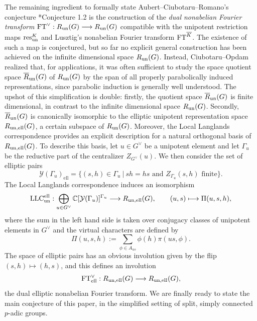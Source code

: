 The remaining ingredient to formally state Aubert--Ciubotaru--Romano's conjecture \cite{AubertCiubotaruRomano2024}*{Conjecture 1.2} is the construction of the \textit{dual nonabelian Fourier transform} $\mathrm{FT}^\vee:R_{\mathrm{un}}(G)\longrightarrow R_{\mathrm{un}}(G)$ compatible with the unipotent restriction maps $\mathrm{res}_{\mathrm{un}}^K$ and Lusztig's nonabelian Fourier transform $\mathrm{FT}^{\overline{K}}$. The existence of such a map is conjectured, but so far no explicit general construction has been achieved on the infinite dimensional space $R_{\mathrm{un}}(G)$. Instead, Ciubotaru--Opdam \cite{CiubotaruOpdam2010} realized that, for applications, it was often sufficient to study the space quotient space $\overline{R}_{\mathrm{un}}(G)$ of $R_{\mathrm{un}}(G)$ by the span of all properly parabolically induced representations, since parabolic induction is generally well understood. The upshot of this simplification is double: firstly, the quotient space $\overline{R}_{\mathrm{un}}(G)$ is finite dimensional, in contrast to the infinite dimensional space $R_{\mathrm{un}}(G)$. Secondly, $\overline{R}_{\mathrm{un}}(G)$ is canonically isomorphic to the elliptic unipotent representation space $R_{\mathrm{un},\mathrm{ell}}(G)$, a certain subspace of $R_{\mathrm{un}}(G)$. Moreover, the Local Langlands correspondence provides an explicit description for a natural orthogonal basis of $R_{\mathrm{un},\mathrm{ell}}(G)$. To describe this basis, let $u\in G^\vee$ be a unipotent element and let $\Gamma_u$ be the reductive part of the centralizer $Z_{G^\vee}(u)$. We then consider the set of elliptic pairs $$\mathcal{Y}(\Gamma_u)_{\mathrm{ell}}=\{(s,h)\in\Gamma_u\ |\ sh=hs\text{ and }Z_{\Gamma_u}(s,h)\text{ finite}\}.$$
The Local Langlands correspondence induces an isomorphism
\begin{equation*}
    \mathrm{LLC}^{\mathrm{ell}}_{\mathrm{un}}:\bigoplus_{u\in G^\vee}\mathbb{C}[\mathcal{Y}(\Gamma_u)]^{\Gamma_u}\longrightarrow R_{\mathrm{un},\mathrm{ell}}(G),\quad\quad (u,s)\longmapsto\Pi(u,s,h),
\end{equation*}
where the sum in the left hand side is taken over conjugacy classes of unipotent elements in $G^\vee$ and the virtual characters are defined by 
$$\Pi(u,s,h):=\sum_{\phi\in A_{us}}\phi(h)\pi(us,\phi).$$
The space of elliptic pairs has an obvious involution given by the flip $(s,h)\mapsto(h,s)$, and this defines an involution 
$$\mathrm{FT}^\vee_{\mathrm{ell}}:R_{\mathrm{un},\mathrm{ell}}(G)\longrightarrow R_{\mathrm{un},\mathrm{ell}}(G),$$
the dual elliptic nonabelian Fourier transform. We are finally ready to state the main conjecture of this paper, in the simplified setting of split, simply connected $p$-adic groups.
